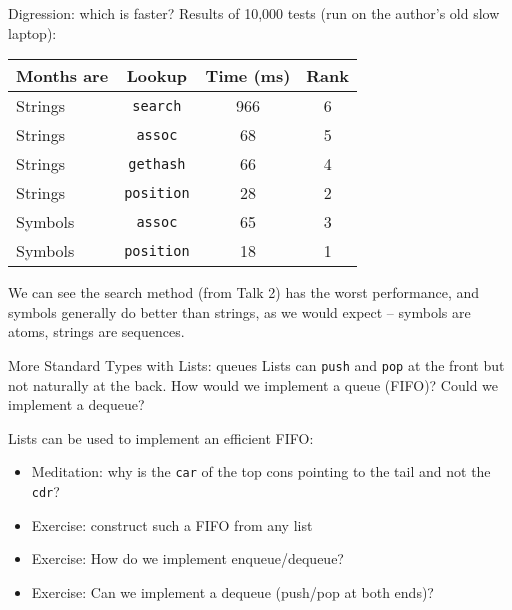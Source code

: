 \documentclass[presentation]{beamer}
\begin{document}
\begin{frame}{Digression: which is faster?}
  Results of 10,000 tests (run on the author's old slow laptop):

  \medskip
\begin{tabular}{|l|c|c|c|}
  \hline
  Months are & Lookup & Time (ms) & Rank \\
  \hline\hline
  Strings & \texttt{search} & 966 & 6 \\
  Strings & \texttt{assoc} & 68 & 5 \\
  Strings & \texttt{gethash} & 66 & 4 \\
  Strings & \texttt{position} & 28 & 2 \\
  Symbols & \texttt{assoc} & 65 & 3 \\
  Symbols & \texttt{position} & 18 & 1 \\
  \hline
\end{tabular}

\medskip
We can see the search method (from Talk 2) has the worst performance, and symbols generally do better than strings, as we would expect -- symbols are atoms, strings are sequences.
\end{frame}

\begin{frame}[fragile]{More Standard Types with Lists: queues}
  Lists can \texttt{push} and \texttt{pop} at the front but not naturally at the back.  How would we implement a queue (FIFO)?  Could we implement a dequeue?

  \medskip
  Lists can be used to implement an efficient FIFO:

  \medskip
  \begin{itemize}
  \item Meditation: why is the \texttt{car} of the top cons pointing to the tail and not the \texttt{cdr}?
  \item Exercise: construct such a FIFO from any list
  \item Exercise: How do we implement enqueue/dequeue?
  \item Exercise: Can we implement a dequeue (push/pop at both ends)?
  \end{itemize}
\end{frame}
\end{document}
